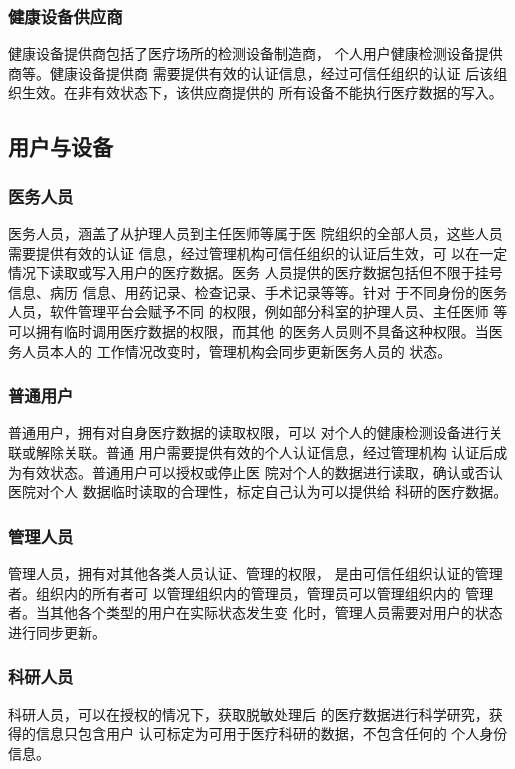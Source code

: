 \documentclass[UTF8]{ctexart}
\begin{document}
    \subsubsection{健康设备供应商}
    \par
    健康设备提供商包括了医疗场所的检测设备制造商，
    个人用户健康检测设备提供商等。健康设备提供商
    需要提供有效的认证信息，经过可信任组织的认证
    后该组织生效。在非有效状态下，该供应商提供的
    所有设备不能执行医疗数据的写入。
    \subsection{用户与设备}
    \subsubsection{医务人员}
    \par
    医务人员，涵盖了从护理人员到主任医师等属于医
    院组织的全部人员，这些人员需要提供有效的认证
    信息，经过管理机构可信任组织的认证后生效，可
    以在一定情况下读取或写入用户的医疗数据。医务
    人员提供的医疗数据包括但不限于挂号信息、病历
    信息、用药记录、检查记录、手术记录等等。针对
    于不同身份的医务人员，软件管理平台会赋予不同
    的权限，例如部分科室的护理人员、主任医师
    等可以拥有临时调用医疗数据的权限，而其他
    的医务人员则不具备这种权限。当医务人员本人的
    工作情况改变时，管理机构会同步更新医务人员的
    状态。
    \subsubsection{普通用户}
    \par
    普通用户，拥有对自身医疗数据的读取权限，可以
    对个人的健康检测设备进行关联或解除关联。普通
    用户需要提供有效的个人认证信息，经过管理机构
    认证后成为有效状态。普通用户可以授权或停止医
    院对个人的数据进行读取，确认或否认医院对个人
    数据临时读取的合理性，标定自己认为可以提供给
    科研的医疗数据。

    \subsubsection{管理人员}
    \par
    管理人员，拥有对其他各类人员认证、管理的权限，
    是由可信任组织认证的管理者。组织内的所有者可
    以管理组织内的管理员，管理员可以管理组织内的
    管理者。当其他各个类型的用户在实际状态发生变
    化时，管理人员需要对用户的状态进行同步更新。
    \subsubsection{科研人员}
    \par
    科研人员，可以在授权的情况下，获取脱敏处理后
    的医疗数据进行科学研究，获得的信息只包含用户
    认可标定为可用于医疗科研的数据，不包含任何的
    个人身份信息。
\end{document}
